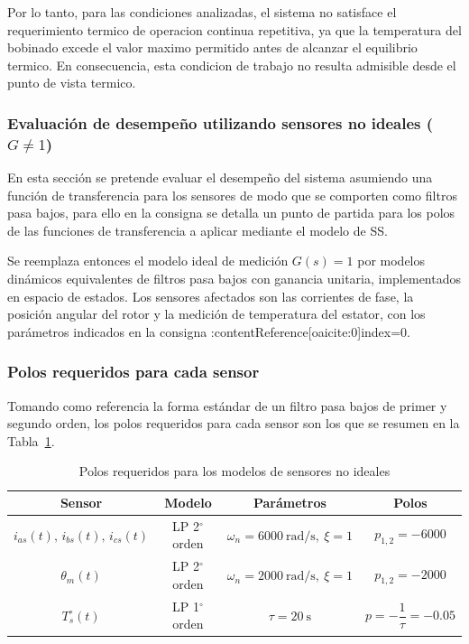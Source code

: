 \documentclass[12pt, a4paper,journal, onecolumn, compsoc]{IEEEtran}
\begin{document}
Por lo tanto, para las condiciones analizadas, el sistema no satisface el requerimiento termico de operacion continua repetitiva, ya que la temperatura del bobinado excede el valor maximo permitido antes de alcanzar el equilibrio termico. En consecuencia, esta condicion de trabajo no resulta admisible desde el punto de vista termico.
\subsubsection{Evaluación de desempeño utilizando sensores no ideales ($G\neq 1$)}
En esta sección se pretende evaluar el desempeño del sistema asumiendo una función de transferencia para los sensores de modo que se comporten como filtros pasa bajos, para ello en la consigna se detalla un punto de partida para los polos de las funciones de transferencia a aplicar mediante el modelo de SS.

Se reemplaza entonces el modelo ideal de medición $G(s)=1$ por modelos dinámicos equivalentes de filtros pasa bajos con ganancia unitaria, implementados en espacio de estados. Los sensores afectados son las corrientes de fase, la posición angular del rotor y la medición de temperatura del estator, con los parámetros indicados en la consigna :contentReference[oaicite:0]{index=0}.

\subsubsection*{Polos requeridos para cada sensor}

Tomando como referencia la forma estándar de un filtro pasa bajos de primer y segundo orden, los polos requeridos para cada sensor son los que se resumen en la Tabla~\ref{tab:polos_sensores}.

\begin{table}[H]
    \centering
    \caption{Polos requeridos para los modelos de sensores no ideales}
    \label{tab:polos_sensores}
    \begin{tabular}{|c|c|c|c|}
        \hline
        \textbf{Sensor} & \textbf{Modelo} & \textbf{Parámetros} & \textbf{Polos} \\
        \hline
        $i_{as}(t),\,i_{bs}(t),\,i_{cs}(t)$ 
        & LP 2$^\circ$ orden 
        & $\omega_n=6000\ \text{rad/s},\ \xi=1$ 
        & $p_{1,2}=-6000$ \\
        \hline
        $\theta_m(t)$ 
        & LP 2$^\circ$ orden 
        & $\omega_n=2000\ \text{rad/s},\ \xi=1$ 
        & $p_{1,2}=-2000$ \\
        \hline
        $T_s^\circ(t)$ 
        & LP 1$^\circ$ orden 
        & $\tau=20\ \text{s}$ 
        & $p=-\dfrac{1}{\tau}=-0.05$ \\
        \hline
    \end{tabular}
\end{table}
\end{document}
